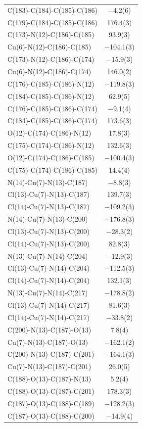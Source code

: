 \begin{center}
{\begin{supertabular}{p{1.8in}c}
C(183)-C(184)-C(185)-C(186)&$-$4.2(6)\\
C(179)-C(184)-C(185)-C(186)&176.4(3)\\
C(173)-N(12)-C(186)-C(185)&93.9(3)\\
Cu(6)-N(12)-C(186)-C(185)&$-$104.1(3)\\
C(173)-N(12)-C(186)-C(174)&$-$15.9(3)\\
Cu(6)-N(12)-C(186)-C(174)&146.0(2)\\
C(176)-C(185)-C(186)-N(12)&$-$119.8(3)\\
C(184)-C(185)-C(186)-N(12)&62.9(5)\\
C(176)-C(185)-C(186)-C(174)&$-$9.1(4)\\
C(184)-C(185)-C(186)-C(174)&173.6(3)\\
O(12)-C(174)-C(186)-N(12)&17.8(3)\\
C(175)-C(174)-C(186)-N(12)&132.6(3)\\
O(12)-C(174)-C(186)-C(185)&$-$100.4(3)\\
C(175)-C(174)-C(186)-C(185)&14.4(4)\\
N(14)-Cu(7)-N(13)-C(187)&$-$8.8(3)\\
Cl(13)-Cu(7)-N(13)-C(187)&139.7(3)\\
Cl(14)-Cu(7)-N(13)-C(187)&$-$109.2(3)\\
N(14)-Cu(7)-N(13)-C(200)&$-$176.8(3)\\
Cl(13)-Cu(7)-N(13)-C(200)&$-$28.3(2)\\
Cl(14)-Cu(7)-N(13)-C(200)&82.8(3)\\
N(13)-Cu(7)-N(14)-C(204)&$-$12.9(3)\\
Cl(13)-Cu(7)-N(14)-C(204)&$-$112.5(3)\\
Cl(14)-Cu(7)-N(14)-C(204)&132.1(3)\\
N(13)-Cu(7)-N(14)-C(217)&$-$178.8(2)\\
Cl(13)-Cu(7)-N(14)-C(217)&81.6(3)\\
Cl(14)-Cu(7)-N(14)-C(217)&$-$33.8(2)\\
C(200)-N(13)-C(187)-O(13)&7.8(4)\\
Cu(7)-N(13)-C(187)-O(13)&$-$162.1(2)\\
C(200)-N(13)-C(187)-C(201)&$-$164.1(3)\\
Cu(7)-N(13)-C(187)-C(201)&26.0(5)\\
C(188)-O(13)-C(187)-N(13)&5.2(4)\\
C(188)-O(13)-C(187)-C(201)&178.3(3)\\
C(187)-O(13)-C(188)-C(189)&$-$128.2(3)\\
C(187)-O(13)-C(188)-C(200)&$-$14.9(4)\\

\end{supertabular}}
\end{center}

